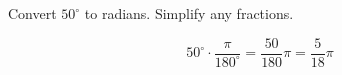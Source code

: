 Convert $50^{\circ}$ to radians. Simplify any fractions.

$$
50^{\circ} \cdot \frac{\pi}{180^{\circ}} = \frac{50}{180} \pi = \frac{5}{18} \pi
$$
